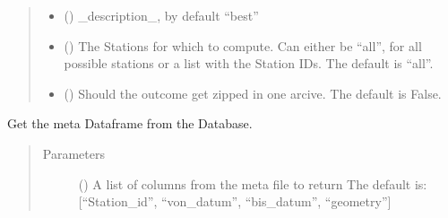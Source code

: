 \documentclass[letterpaper,10pt,english]{sphinxmanual}
\begin{document}
\begin{fulllineitems}
\begin{fulllineitems}
\begin{quote}
\begin{description}
\begin{itemize}
\item {} 
\sphinxAtStartPar
{} (\sphinxstyleliteralemphasis{\sphinxupquote{, }}) \textendash{} \_description\_, by default “best”

\item {} 
\sphinxAtStartPar
{} (\sphinxstyleliteralemphasis{\sphinxupquote{, }}) \textendash{} The Stations for which to compute.
Can either be “all”, for all possible stations
or a list with the Station IDs.
The default is “all”.

\item {} 
\sphinxAtStartPar
{} (\sphinxstyleliteralemphasis{\sphinxupquote{, }}) \textendash{} Should the outcome get zipped in one arcive.
The default is False.

\end{itemize}

\end{description}\end{quote}

\end{fulllineitems}


\begin{fulllineitems}
\label{\detokenize{weatherDB:weatherDB.stations.GroupStations.get_meta}}
\sphinxAtStartPar
Get the meta Dataframe from the Database.
\begin{quote}\begin{description}
\item[{Parameters}] \leavevmode
\sphinxAtStartPar
{} (\sphinxstyleliteralemphasis{\sphinxupquote{, }}) \textendash{} A list of columns from the meta file to return
The default is: {[}“Station\_id”, “von\_datum”, “bis\_datum”, “geometry”{]}


\end{description}
\end{quote}
\end{fulllineitems}
\end{fulllineitems}
\end{document}
